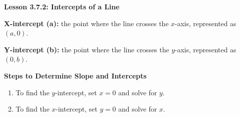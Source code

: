  \begin{center}
\textbf{Lesson 3.7.2: Intercepts of a Line}
\end{center}

\vspace*{1ex}

    \noindent \textbf{X-intercept (a):} the point where the line crosses the $x$-axis, represented as $(a, 0)$.

    \noindent \textbf{Y-intercept (b):} the point where the line crosses the $y$-axis, represented as $(0, b)$.


\noindent\textbf{Steps to Determine Slope and Intercepts}

\begin{enumerate}
        \item To find the $y$-intercept, set $x = 0$ and solve for $y$.
        \item To find the $x$-intercept, set $y = 0$ and solve for $x$.
\end{enumerate}


